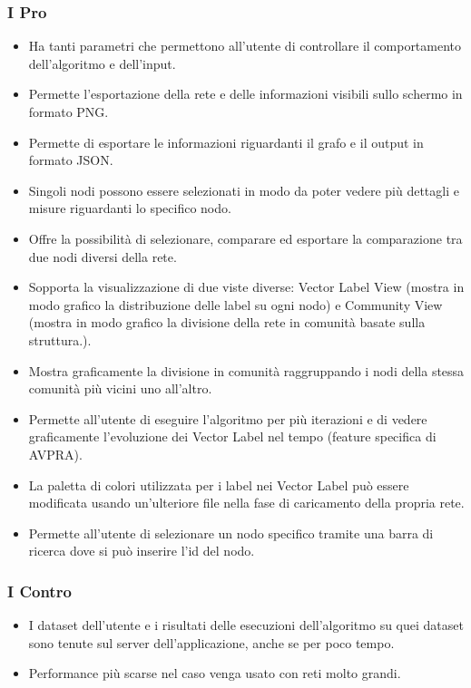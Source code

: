 \documentclass[a4paper,12pt]{report}
\begin{document}
			\subsubsection*{I Pro}
				\begin{itemize}
					\item Ha tanti parametri che permettono all'utente di controllare il comportamento dell'algoritmo e dell'input.
					\item Permette l'esportazione della rete e delle informazioni visibili sullo schermo in formato PNG.
					\item Permette di esportare le informazioni riguardanti il grafo e il output in formato JSON.
					\item Singoli nodi possono essere selezionati in modo da poter vedere più dettagli e misure riguardanti lo specifico nodo.
					\item Offre la possibilità di selezionare, comparare ed esportare la comparazione tra due nodi diversi della rete.
					\item Sopporta la visualizzazione di due viste diverse: Vector Label View (mostra in modo grafico la distribuzione delle label su ogni nodo) e Community View (mostra in modo grafico la divisione della rete in comunità basate sulla struttura.).
					\item Mostra graficamente la divisione in comunità raggruppando i nodi della stessa comunità più vicini uno all'altro.
					\item Permette all'utente di eseguire l'algoritmo per più iterazioni e di vedere graficamente l'evoluzione dei Vector Label nel tempo (feature specifica di AVPRA).
					\item La paletta di colori utilizzata per i label nei Vector Label può essere modificata usando un'ulteriore file nella fase di caricamento della propria rete.
					\item Permette all'utente di selezionare un nodo specifico tramite una barra di ricerca dove si può inserire l'id del nodo.
				\end{itemize}
						
			\subsubsection*{I Contro}
				\begin{itemize}
					\item I dataset dell'utente e i risultati delle esecuzioni dell'algoritmo su quei dataset sono tenute sul server dell'applicazione, anche se per poco tempo.
					\item Performance più scarse nel caso venga usato con reti molto grandi.
				\end{itemize}
\end{document}
